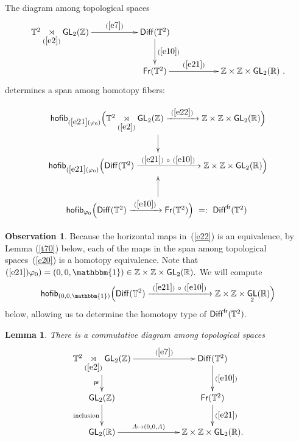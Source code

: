 \documentclass{amsart}
\newtheorem{lemma}[theorem]{Lemma}
\theoremstyle{definition}
\newtheorem{observation}[theorem]{Observation}
\theoremstyle{remark}
\DeclareMathOperator{\pr}{\mathsf{pr}}
\DeclareMathOperator{\Diff}{{\sf Diff}}
\DeclareMathOperator{\fr}{\sf fr}
\newcommand{\xra}{\xrightarrow}
\DeclareMathOperator{\uno}{\mathbbm{1}}
\DeclareMathOperator{\GL}{\sf GL}
\DeclareMathOperator{\Fr}{\sf Fr}
\begin{document}
The diagram among topological spaces
\begin{equation}\label{e22}
\xymatrix{
\TT^2 \underset{(\ref{e2})}\rtimes \GL_2(\ZZ) \ar[rr]^-{(\ref{e7})} 
&&
\Diff(\TT^2) \ar[d]^-{(\ref{e10})}
&&
\\
&&
\Fr(\TT^2) \ar[rr]^-{(\ref{e21})}
&&
\ZZ\times \ZZ \times \GL_2(\RR)
~
.
}
\end{equation} 
determines a span among homotopy fibers:

\begin{equation}\label{e20}
\xymatrix{
{\sf hofib}_{(\ref{e21}(\varphi_0)}\Bigl(
\TT^2 \underset{(\ref{e2})}\rtimes \GL_2(\ZZ)
\xra{~(\ref{e22})~}
\ZZ\times \ZZ \times \GL_2(\RR)
\Bigr) \ar[d]^-{}
\\
{\sf hofib}_{(\ref{e21}(\varphi_0)}\Bigl(
\Diff(\TT^2)
\xra{~(\ref{e21})~ \circ ~(\ref{e10})~}
\ZZ\times \ZZ \times \GL_2(\RR)
\Bigr)
\\
{\sf hofib}_{\varphi_0}\Bigl(
\Diff(\TT^2)
\xra{~(\ref{e10})~}
\Fr(\TT^2)
\Bigr)
~=:~
\Diff^{\fr}(\TT^2)
~
\ar[u]^-{}
}
\end{equation}



\begin{observation}\label{t6}
Because the horizontal maps in~(\ref{e22}) is an equivalence, by Lemma (\ref{t70}) below, each of the maps in the span among topological spaces~(\ref{e20}) is a homotopy equivalence. Note that $(\ref{e21})\varphi_0) = (0, 0, \uno) \in \ZZ \times \ZZ \times \GL_{2}(\RR).$
We will compute $${\sf hofib}_{(0, 0, \uno)}\Bigl(
\Diff(\TT^2)
\xra{~(\ref{e21})~ \circ ~(\ref{e10})~}
\ZZ\times \ZZ \times \GL_2(\RR)
\Bigr)$$ below, allowing us to determine the homotopy type of $\Diff^{\fr}(\TT^2).$
\end{observation}


\begin{lemma}\label{t4}
There is a commutative diagram among topological spaces
\begin{equation}\label{e19}
\xymatrix{
\TT^2 \underset{(\ref{e2})}\rtimes \GL_2(\ZZ) \ar[rr]^-{(\ref{e7})} \ar[d]_-{\pr}
&&
\Diff(\TT^2) \ar[d]^-{(\ref{e10})}
\\
\GL_2(\ZZ) \ar[d]_-{\rm inclusion}
&&
\Fr(\TT^2) \ar[d]^-{(\ref{e21})}
\\
\GL_2(\RR) \ar[rr]^-{A\mapsto (0,0,A)}
&&
\ZZ\times \ZZ \times \GL_2(\RR)
.
}
\end{equation}
\end{lemma}
\end{document}
